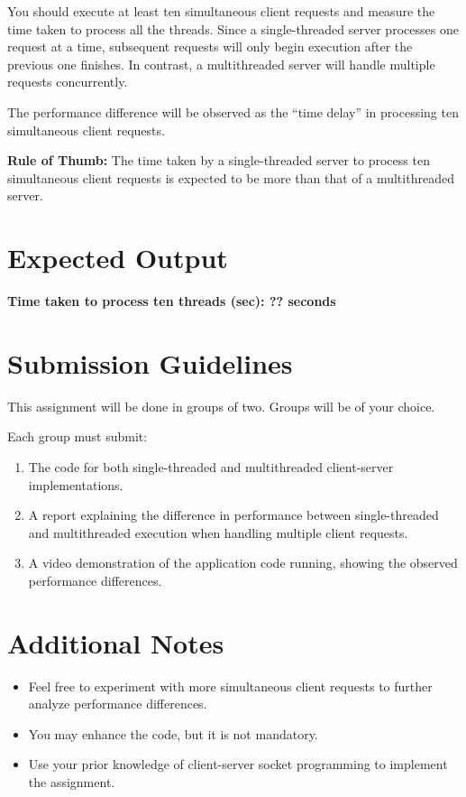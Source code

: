 \documentclass{article}
\begin{document}
You should execute at least ten simultaneous client requests and measure the time taken to process all the threads. Since a single-threaded server processes one request at a time, subsequent requests will only begin execution after the previous one finishes. In contrast, a multithreaded server will handle multiple requests concurrently.

The performance difference will be observed as the ``time delay'' in processing ten simultaneous client requests.

\textbf{Rule of Thumb:} The time taken by a single-threaded server to process ten simultaneous client requests is expected to be more than that of a multithreaded server.

\section{Expected Output}
\textbf{Time taken to process ten threads (sec): ?? seconds}

\section{Submission Guidelines}
This assignment will be done in groups of two. Groups will be of your choice.

Each group must submit:
\begin{enumerate}
    \item The code for both single-threaded and multithreaded client-server implementations.
    \item A report explaining the difference in performance between single-threaded and multithreaded execution when handling multiple client requests.
    \item A video demonstration of the application code running, showing the observed performance differences.
\end{enumerate}

\section{Additional Notes}
\begin{itemize}
    \item Feel free to experiment with more simultaneous client requests to further analyze performance differences.
    \item You may enhance the code, but it is not mandatory.
    \item Use your prior knowledge of client-server socket programming to implement the assignment.
\end{itemize}
\end{document}
